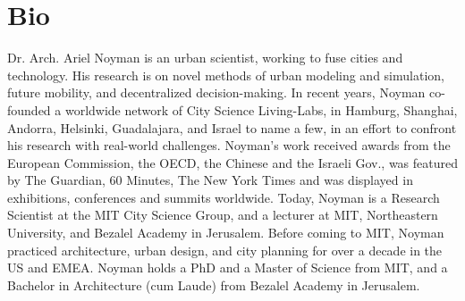 \section*{Bio}

 {
  Dr. Arch. Ariel Noyman is an urban scientist, working to fuse cities and technology. His research is on novel methods of urban modeling and simulation, future mobility, and decentralized decision-making. In recent years, Noyman co-founded a worldwide network of City Science Living-Labs, in Hamburg, Shanghai, Andorra, Helsinki, Guadalajara, and Israel to name a few, in an effort to confront his research with real-world challenges. Noyman's work received awards from the European Commission, the OECD, the Chinese and the Israeli Gov., was featured by The Guardian, 60 Minutes, The New York Times and was displayed in exhibitions, conferences and summits worldwide. Today, Noyman is a Research Scientist at the MIT City Science Group, and a lecturer at MIT, Northeastern University, and Bezalel Academy in Jerusalem. Before coming to MIT, Noyman practiced architecture, urban design, and city planning for over a decade in the US and EMEA. Noyman holds a PhD and a Master of Science from MIT, and a Bachelor in Architecture (cum Laude) from Bezalel Academy in Jerusalem.
 }




